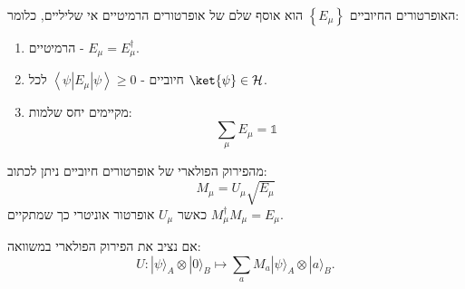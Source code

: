 \documentclass{tstextbook}
\begin{document}
\begin{proposition}
האופרטורים החיוביים \(\left\{  E_{\mu}  \right\}\) הוא אוסף שלם של אופרטורים הרמיטיים אי שליליים, כלומר:

  \begin{enumerate}
    \item הרמיטיים -  \(E_{\mu}=E_{\mu}^{\dagger}\). 


    \item חיוביים - \(\left\langle  \psi|E_{\mu}|\psi  \right\rangle \geq 0\) לכל \(\ket{\psi}\in \mathcal{H}\). 


    \item מקיימים יחס שלמות: 
$$\sum_{\mu}E_{\mu}=\mathbb{1} $$


  \end{enumerate}
\end{proposition}
\begin{corollary}
מהפירוק הפולארי של אופרטורים חיוביים ניתן לכתוב:
$$M_{\mu}=U_{\mu}\sqrt{ E_{\mu} }$$
כאשר \(U_{\mu}\) אופרטור אוניטרי כך שמתקיים \(M_{\mu}^{\dagger}M_{\mu}=E_{\mu}\).

\end{corollary}
\begin{proposition}
אם נציב את הפירוק הפולארי במשוואה:
$$U:|\psi\rangle_{A}\otimes|0\rangle_{B}\mapsto\sum_{a}M_{a}|\psi\rangle_{A}\otimes|a\rangle_{B}.$$

\end{proposition}
\end{document}
